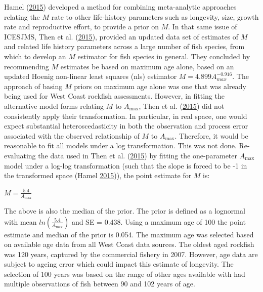 \documentclass[12pt,]{article}
\begin{document}
Hamel (\protect\hyperlink{ref-hamel_method_2015}{2015}) developed a
method for combining meta-analytic approaches relating the \(M\) rate to
other life-history parameters such as longevity, size, growth rate and
reproductive effort, to provide a prior on \(M\). In that same issue of
ICESJMS, Then et al.
(\protect\hyperlink{ref-then_evaluating_2015}{2015}), provided an
updated data set of estimates of \(M\) and related life history
parameters across a large number of fish species, from which to develop
an \(M\) estimator for fish species in general. They concluded by
recommending \(M\) estimates be based on maximum age alone, based on an
updated Hoenig non-linear least squares (nls) estimator
\(M=4.899A^{-0.916}_{max}\). The approach of basing \(M\) priors on
maximum age alone was one that was already being used for West Coast
rockfish assessments. However, in fitting the alternative model forms
relating \(M\) to \(A_{\text{max}}\), Then et al.
(\protect\hyperlink{ref-then_evaluating_2015}{2015}) did not
consistently apply their transformation. In particular, in real space,
one would expect substantial heteroscedasticity in both the observation
and process error associated with the observed relationship of \(M\) to
\(A_{\text{max}}\). Therefore, it would be reasonable to fit all models
under a log transformation. This was not done. Re-evaluating the data
used in Then et al. (\protect\hyperlink{ref-then_evaluating_2015}{2015})
by fitting the one-parameter \(A_{\text{max}}\) model under a log-log
transformation (such that the slope is forced to be -1 in the
transformed space (Hamel
\protect\hyperlink{ref-hamel_method_2015}{2015})), the point estimate
for \(M\) is:

\begin{centering}

$M=\frac{5.4}{A_{\text{max}}}$

\end{centering}

The above is also the median of the prior. The prior is defined as a
lognormal with mean \(ln(\frac{5.4}{A_{\text{max}}})\) and SE = 0.438.
Using a maximum age of 100 the point estimate and median of the prior is
0.054. The maximum age was selected based on available age data from all
West Coast data sources. The oldest aged rockfish was 120 years,
captured by the commercial fishery in 2007. However, age data are
subject to ageing error which could impact this estimate of longevity.
The selection of 100 years was based on the range of other ages
available with had multiple observations of fish between 90 and 102
years of age.
\end{document}
